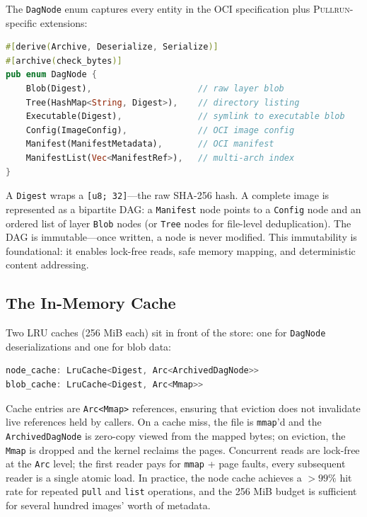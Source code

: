 \documentclass[11pt,a4paper]{article}
\newcommand{\pullrun}{\textsc{Pullrun}}
\newcommand{\mmap}{\texttt{mmap}}
\begin{document}
The \texttt{DagNode} enum captures every entity in the OCI specification plus \pullrun{}-specific extensions:

\begin{lstlisting}[language=Rust]
#[derive(Archive, Deserialize, Serialize)]
#[archive(check_bytes)]
pub enum DagNode {
    Blob(Digest),                     // raw layer blob
    Tree(HashMap<String, Digest>),    // directory listing
    Executable(Digest),               // symlink to executable blob
    Config(ImageConfig),              // OCI image config
    Manifest(ManifestMetadata),       // OCI manifest
    ManifestList(Vec<ManifestRef>),   // multi-arch index
}
\end{lstlisting}

A \texttt{Digest} wraps a \texttt{[u8; 32]}---the raw SHA-256 hash. A complete image is represented as a bipartite DAG: a \texttt{Manifest} node points to a \texttt{Config} node and an ordered list of layer \texttt{Blob} nodes (or \texttt{Tree} nodes for file-level deduplication). The DAG is immutable---once written, a node is never modified. This immutability is foundational: it enables lock-free reads, safe memory mapping, and deterministic content addressing.

\subsection{The In-Memory Cache}

Two LRU caches (256 MiB each) sit in front of the store: one for \texttt{DagNode} deserializations and one for blob data:

\begin{lstlisting}[language=Rust]
node_cache: LruCache<Digest, Arc<ArchivedDagNode>>
blob_cache: LruCache<Digest, Arc<Mmap>>
\end{lstlisting}

Cache entries are \texttt{Arc<Mmap>} references, ensuring that eviction does not invalidate live references held by callers. On a cache miss, the file is \mmap{}'d and the \texttt{ArchivedDagNode} is zero-copy viewed from the mapped bytes; on eviction, the \texttt{Mmap} is dropped and the kernel reclaims the pages. Concurrent reads are lock-free at the \texttt{Arc} level; the first reader pays for \mmap{} + page faults, every subsequent reader is a single atomic load. In practice, the node cache achieves a $>99\%$ hit rate for repeated \texttt{pull} and \texttt{list} operations, and the 256 MiB budget is sufficient for several hundred images' worth of metadata.
\end{document}
